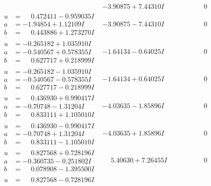 \documentclass[1p]{elsarticle_modified}
\theoremstyle{definition}
\begin{document}
$$\begin{array}{c|c|c}
 & -3.90875 + 7.44310 I & \phantom{-0.000000 } 0 \\ \hline\begin{aligned}
u &= \phantom{-}0.472411 - 0.959035 I \\
a &= -1.94854 + 1.12109 I \\
b &= \phantom{-}0.443886 + 1.273270 I\end{aligned}
 & -3.90875 - 7.44310 I & \phantom{-0.000000 } 0 \\ \hline\begin{aligned}
u &= -0.265182 + 1.035910 I \\
a &= -0.540567 + 0.578355 I \\
b &= \phantom{-}0.627717 + 0.218999 I\end{aligned}
 & -1.64134 - 0.64025 I & \phantom{-0.000000 } 0 \\ \hline\begin{aligned}
u &= -0.265182 - 1.035910 I \\
a &= -0.540567 - 0.578355 I \\
b &= \phantom{-}0.627717 - 0.218999 I\end{aligned}
 & -1.64134 + 0.64025 I & \phantom{-0.000000 } 0 \\ \hline\begin{aligned}
u &= \phantom{-}0.436930 + 0.990417 I \\
a &= -0.70748 - 1.31204 I \\
b &= \phantom{-}0.833111 + 1.105010 I\end{aligned}
 & -4.03635 - 1.85896 I & \phantom{-0.000000 } 0 \\ \hline\begin{aligned}
u &= \phantom{-}0.436930 - 0.990417 I \\
a &= -0.70748 + 1.31204 I \\
b &= \phantom{-}0.833111 - 1.105010 I\end{aligned}
 & -4.03635 + 1.85896 I & \phantom{-0.000000 } 0 \\ \hline\begin{aligned}
u &= \phantom{-}0.827568 + 0.728196 I \\
a &= -0.360735 - 0.251802 I \\
b &= \phantom{-}0.078908 - 1.395500 I\end{aligned}
 & \phantom{-}5.40630 + 7.26455 I & \phantom{-0.000000 } 0 \\ \hline\begin{aligned}
u &= \phantom{-}0.827568 - 0.728196 I \\

\end{aligned}
\end{array}$$
\end{document}
